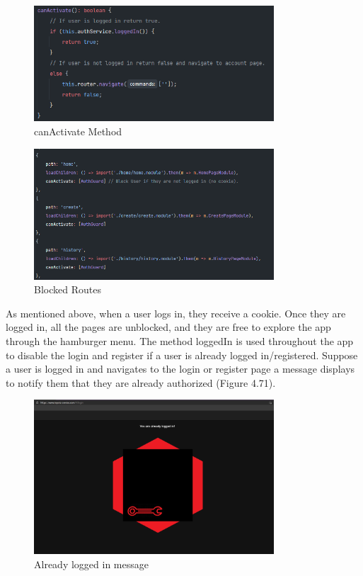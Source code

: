 \begin{figure}[H]
    \centering
    \caption{canActivate Method}
    \label{image:canActivate}
    \includegraphics[width=0.8\textwidth]{images/repota/auth_guard/can_activate.png}
\end{figure}

\begin{figure}[H]
    \centering
    \caption{Blocked Routes}
    \label{image:blocked}
    \includegraphics[width=0.8\textwidth]{images/repota/auth_guard/blocked_routes.png}
\end{figure}

As mentioned above, when a user logs in, they receive a cookie. Once they are logged in, all the pages are unblocked, and they are free to explore the app through the hamburger menu. The method loggedIn is used throughout the app to disable the login and register if a user is already logged in/registered. Suppose a user is logged in and navigates to the login or register page a message displays to notify them that they are already authorized (Figure 4.71). 

\begin{figure}[H]
    \centering
    \caption{Already logged in message}
    \label{image:alreadyLoggedIn}
    \includegraphics[width=0.8\textwidth]{images/repota/UI/already_loggedIn.png}
\end{figure}

